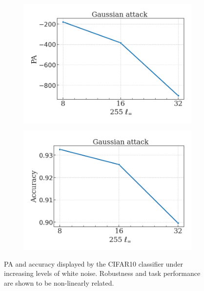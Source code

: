 \begin{figure}[b]
    \centering
    \begin{subfigure}[b]{0.45\textwidth}
        \centering
        \includegraphics[width=\textwidth]{img/results_discussion/adversarial/GAUSSIAN_logPA_eps_single.png}
    \end{subfigure}
    \hfill
    \begin{subfigure}[b]{0.45\textwidth}
        \centering
        \includegraphics[width=\textwidth]{img/results_discussion/adversarial/GAUSSIAN_acc_pa_eps_single.png}
    \end{subfigure}
    \caption{PA and accuracy displayed by the CIFAR10 classifier under increasing levels of white noise. Robustness
    and task performance are shown to be non-linearly related.
    }
    \label{fig:gaussian_noise}
\end{figure}



